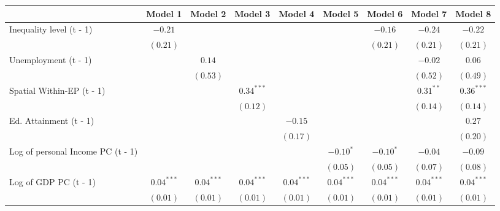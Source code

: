 
\begin{table}
\begin{center}
\begin{tabular}{l c c c c c c c c}
\hline
 & Model 1 & Model 2 & Model 3 & Model 4 & Model 5 & Model 6 & Model 7 & Model 8 \\
\hline
Inequality level (t - 1)          & $-0.21$      &              &              &              &              & $-0.16$      & $-0.24$       & $-0.22$       \\
                                  & $(0.21)$     &              &              &              &              & $(0.21)$     & $(0.21)$      & $(0.21)$      \\
Unemployment (t - 1)              &              & $0.14$       &              &              &              &              & $-0.02$       & $0.06$        \\
                                  &              & $(0.53)$     &              &              &              &              & $(0.52)$      & $(0.49)$      \\
Spatial Within-EP (t - 1)         &              &              & $0.34^{***}$ &              &              &              & $0.31^{**}$   & $0.36^{***}$  \\
                                  &              &              & $(0.12)$     &              &              &              & $(0.14)$      & $(0.14)$      \\
Ed. Attainment (t - 1)            &              &              &              & $-0.15$      &              &              &               & $0.27$        \\
                                  &              &              &              & $(0.17)$     &              &              &               & $(0.20)$      \\
Log of personal Income PC (t - 1) &              &              &              &              & $-0.10^{*}$  & $-0.10^{*}$  & $-0.04$       & $-0.09$       \\
                                  &              &              &              &              & $(0.05)$     & $(0.05)$     & $(0.07)$      & $(0.08)$      \\
Log of GDP PC (t - 1)             & $0.04^{***}$ & $0.04^{***}$ & $0.04^{***}$ & $0.04^{***}$ & $0.04^{***}$ & $0.04^{***}$ & $0.04^{***}$  & $0.04^{***}$  \\
                                  & $(0.01)$     & $(0.01)$     & $(0.01)$     & $(0.01)$     & $(0.01)$     & $(0.01)$     & $(0.01)$      & $(0.01)$      \\

\end{tabular}
\end{center}
\end{table}
